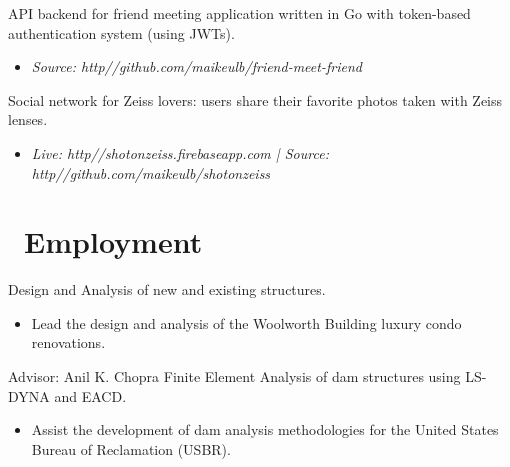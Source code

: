 \documentclass{resume}
\begin{document}
API backend for friend meeting application written in Go with token-based authentication system (using JWTs).
\begin{itemize}
   \item \textit{Source: http//github.com/maikeulb/friend-meet-friend}
\end{itemize}

Social network for Zeiss lovers: users share their favorite photos taken with
Zeiss lenses.
\begin{itemize}
   \item \textit{Live: http//shotonzeiss.firebaseapp.com | Source: http//github.com/maikeulb/shotonzeiss}
\end{itemize}


\section{\faUsers\ Employment}

Design and Analysis of new and existing structures.
\begin{itemize}
  \item Lead the design and analysis of the Woolworth Building
          luxury condo renovations. 
\end{itemize}

 {Advisor: Anil K. Chopra}
Finite Element Analysis of dam structures using LS-DYNA and EACD.
\begin{itemize}
  \item Assist the development of dam analysis methodologies for the United States Bureau of
          Reclamation (USBR).
\end{itemize}
\end{document}
